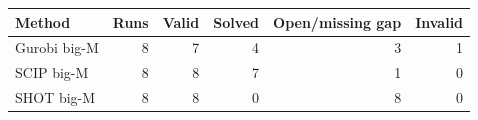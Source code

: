 \begin{tabular}{lrrrrr}
\toprule
Method & Runs & Valid & Solved & Open/missing gap & Invalid \\
\midrule
Gurobi big-M & 8 & 7 & 4 & 3 & 1 \\
SCIP big-M & 8 & 8 & 7 & 1 & 0 \\
SHOT big-M & 8 & 8 & 0 & 8 & 0 \\
\bottomrule
\end{tabular}
